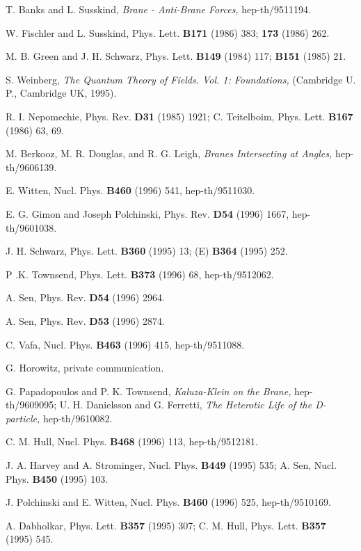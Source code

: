\begin{thebibliography}{99}
T. Banks and L. Susskind, {\it Brane - Anti-Brane Forces,}
hep-th/9511194.

W. Fischler and L.
Susskind, Phys. Lett. {\bf B171} (1986) 383; {\bf 173} (1986) 262.

M. B. Green and J. H. Schwarz, Phys. Lett.
{\bf B149} (1984) 117; {\bf B151} (1985) 21.

S. Weinberg, {\it The Quantum Theory of Fields.  Vol. 1: Foundations,}
(Cambridge U. P., Cambridge UK, 1995). 

R. I. Nepomechie, Phys. Rev. {\bf D31}
(1985) 1921;\hfil\break 
C. Teitelboim, Phys. Lett. {\bf B167} (1986) 63, 69.

M. Berkooz, M. R. Douglas, and R. G. Leigh, {\it Branes Intersecting at
Angles,} hep-th/9606139.

E. Witten, Nucl. Phys. {\bf B460} (1996) 541, hep-th/9511030.

E. G. Gimon and Joseph Polchinski, Phys. Rev. {\bf D54}
(1996) 1667, hep-th/9601038.

J. H. Schwarz, Phys. Lett.
{\bf B360} (1995) 13; (E) {\bf B364} (1995) 252.

P .K. Townsend, Phys. Lett. {\bf B373} (1996) 68, hep-th/9512062.

A. Sen, Phys. Rev. {\bf D54} (1996) 2964.

A. Sen, Phys. Rev. {\bf D53} (1996) 2874.

C. Vafa, Nucl. Phys. {\bf B463} (1996) 415, hep-th/9511088.

G. Horowitz, private communication.

G. Papadopoulos and P. K. Townsend, {\it Kaluza-Klein on the
Brane,} hep-th/9609095;\hfil\break
U. H. Danielsson and G. Ferretti, {\it The Heterotic Life of the D-particle,}
hep-th/9610082.

C. M. Hull, Nucl. Phys. {\bf B468} (1996) 113, hep-th/9512181.

J. A. Harvey and A. Strominger, Nucl. Phys. {\bf B449} (1995) 535;\hfil\break
A. Sen, Nucl. Phys. {\bf B450} (1995) 103.
 
J. Polchinski and E. Witten, Nucl. Phys. {\bf B460} (1996) 525, hep-th/9510169.

A. Dabholkar,  Phys. Lett. {\bf B357} (1995) 307;\hfil\break 
C. M. Hull, Phys. Lett. {\bf B357} (1995) 545.


\end{thebibliography}
